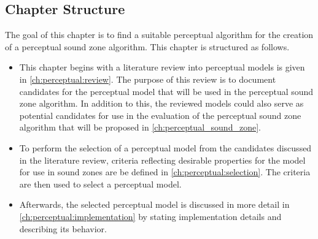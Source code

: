 
\subsection*{Chapter Structure}
The goal of this chapter is to find a suitable perceptual algorithm for the creation of a perceptual sound zone algorithm.
This chapter is structured as follows.

\begin{itemize}
    \item This chapter begins with a literature review into perceptual models is given in \autoref{ch:perceptual:review}.
The purpose of this review is to document candidates for the perceptual model that will be used in the perceptual sound zone algorithm.
In addition to this, the reviewed models could also serve as potential candidates for use in the evaluation 
of the perceptual sound zone algorithm that will be proposed in \autoref{ch:perceptual_sound_zone}.
    \item To perform the selection of a perceptual model from the candidates discussed in the literature review, 
criteria reflecting desirable properties for the model for use in sound zones are be defined in \autoref{ch:perceptual:selection}. 
The criteria are then used to select a perceptual model.
    \item Afterwards, the selected perceptual model is discussed in more detail in \autoref{ch:perceptual:implementation} by stating implementation 
details and describing its behavior.
\end{itemize}

